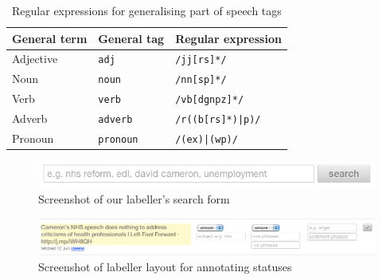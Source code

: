 \begin{center}
\begin{longtable}{ | l | l | l |}
	\caption{Regular expressions for generalising part of speech tags} \label{table:regex_pos} \\
	\hline
	General term & General tag & Regular expression \\
	\hline
	Adjective & \texttt{adj} & \texttt{/jj[rs]*/} \\
 	Noun & \texttt{noun} & \texttt{/nn[sp]*/} \\
	Verb & \texttt{verb} & \texttt{/vb[dgnpz]*/} \\
	Adverb & \texttt{adverb} & \texttt{/r((b[rs]*)|p)/} \\
	Pronoun & \texttt{pronoun} & \texttt{/(ex)|(wp)/} \\
	\hline
\end{longtable}
\end{center}

\begin{figure}
	\centering
	\caption{Screenshot of our labeller's search form}
	\label{fig:labeller_search}
	\includegraphics[width=1\textwidth]{figures/labeller_search_screenshot.png}
\end{figure}

\begin{figure}
	\centering
	\caption{Screenshot of labeller layout for annotating statuses}
	\label{fig:labeller_label}
	\includegraphics[width=1\textwidth]{figures/labeller_label_screenshot.png}
\end{figure}





